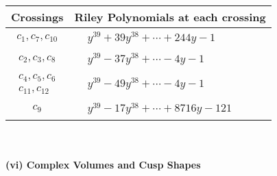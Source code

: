 \documentclass[1p]{elsarticle_modified}
\theoremstyle{definition}
\begin{document}
\begin{tabular}{m{50pt}|m{274pt}}
Crossings & \hspace{64pt}Riley Polynomials at each crossing \\
\hline $$\begin{aligned}c_{1},c_{7},c_{10}\end{aligned}$$&$\begin{aligned}
&y^{39}+39 y^{38}+\cdots+244 y-1
\end{aligned}$\\
\hline $$\begin{aligned}c_{2},c_{3},c_{8}\end{aligned}$$&$\begin{aligned}
&y^{39}-37 y^{38}+\cdots-4 y-1
\end{aligned}$\\
\hline $$\begin{aligned}c_{4},c_{5},c_{6}\\c_{11},c_{12}\end{aligned}$$&$\begin{aligned}
&y^{39}-49 y^{38}+\cdots-4 y-1
\end{aligned}$\\
\hline $$\begin{aligned}c_{9}\end{aligned}$$&$\begin{aligned}
&y^{39}-17 y^{38}+\cdots+8716 y-121
\end{aligned}$\\
\hline
\end{tabular}\\~\\
\newpage\flushleft \textbf{(vi) Complex Volumes and Cusp Shapes}
\end{document}
